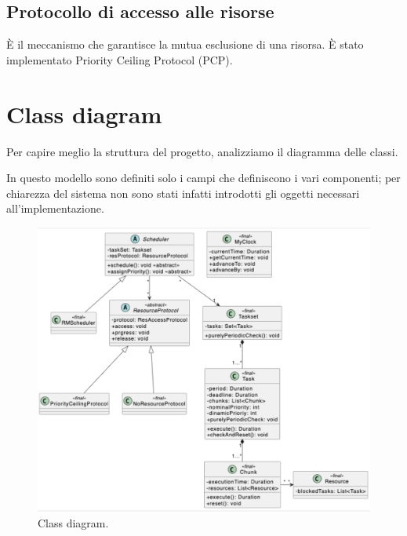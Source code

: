 \subsection{Protocollo di accesso alle risorse}
È il meccanismo che garantisce la mutua esclusione di una risorsa. È stato implementato Priority Ceiling Protocol (PCP).

\section{Class diagram}
Per capire meglio la struttura del progetto, analizziamo il diagramma delle classi.

In questo modello sono definiti solo i campi che definiscono i vari componenti; per chiarezza del sistema non sono stati infatti introdotti gli oggetti necessari all'implementazione.
\begin{figure}[htbp]
    \centering
    \includegraphics[width=1\textwidth]{immagini/class diagram.pdf}
    \caption{Class diagram.}
\end{figure}